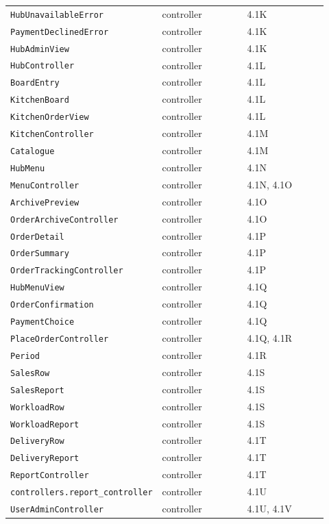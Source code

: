 \begin{longtable}{>{\raggedright\arraybackslash}p{0.3067\linewidth}>{\raggedright\arraybackslash}p{0.3067\linewidth}>{\raggedright\arraybackslash}p{0.3067\linewidth}}
\texttt{HubUnavailableError} & controller & 4.1K \\
\texttt{PaymentDeclinedError} & controller & 4.1K \\
\texttt{HubAdminView} & controller & 4.1K \\
\texttt{HubController} & controller & 4.1L \\
\texttt{BoardEntry} & controller & 4.1L \\
\texttt{KitchenBoard} & controller & 4.1L \\
\texttt{KitchenOrderView} & controller & 4.1L \\
\texttt{KitchenController} & controller & 4.1M \\
\texttt{Catalogue} & controller & 4.1M \\
\texttt{HubMenu} & controller & 4.1N \\
\texttt{MenuController} & controller & 4.1N, 4.1O \\
\texttt{ArchivePreview} & controller & 4.1O \\
\texttt{OrderArchiveController} & controller & 4.1O \\
\texttt{OrderDetail} & controller & 4.1P \\
\texttt{OrderSummary} & controller & 4.1P \\
\texttt{OrderTrackingController} & controller & 4.1P \\
\texttt{HubMenuView} & controller & 4.1Q \\
\texttt{OrderConfirmation} & controller & 4.1Q \\
\texttt{PaymentChoice} & controller & 4.1Q \\
\texttt{PlaceOrderController} & controller & 4.1Q, 4.1R \\
\texttt{Period} & controller & 4.1R \\
\texttt{SalesRow} & controller & 4.1S \\
\texttt{SalesReport} & controller & 4.1S \\
\texttt{WorkloadRow} & controller & 4.1S \\
\texttt{WorkloadReport} & controller & 4.1S \\
\texttt{DeliveryRow} & controller & 4.1T \\
\texttt{DeliveryReport} & controller & 4.1T \\
\texttt{ReportController} & controller & 4.1T \\
\texttt{controllers.\allowbreak{}report\_\allowbreak{}controller} & controller & 4.1U \\
\texttt{UserAdminController} & controller & 4.1U, 4.1V \\

\end{longtable}
